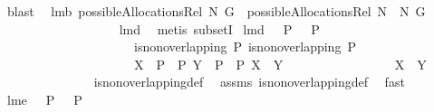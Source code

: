 \begin{isabellebody}
\ blast\ \isanewline
{}\isamarkupfalse%
%
\endisatagproof
{\isafoldproof}%
%
\isadelimproof
\isanewline
%
\endisadelimproof
\isanewline
{}\isamarkupfalse%
\ lm{}{}b{\isacharcolon}\ {\isachardoublequoteopen}possibleAllocationsRel\ N{}\ G\ {\isasymsubseteq}\ possibleAllocationsRel\ {\isacharparenleft}N{}\ {\isasymunion}\ N{}{\isacharparenright}\ G{\isachardoublequoteclose}\isanewline
%
\isadelimproof
\ \ \ \ \ \ \ \ \ \ \ \ \ \ \ \ \ %
\endisadelimproof
%
\isatagproof
{}\isamarkupfalse%
\ lm{}{}d\ \isamarkupfalse%
\ {\isacharparenleft}metis\ subsetI{\isacharparenright}%
\endisatagproof
{\isafoldproof}%
%
\isadelimproof
\isanewline
%
\endisadelimproof
\isanewline
{}\isamarkupfalse%
\ lm{}{}d{\isacharcolon}\ \ {\isachardoublequoteopen}{\isacharparenleft}{\isasymUnion}\ P{}{\isacharparenright}\ {\isasyminter}\ {\isacharparenleft}{\isasymUnion}\ P{}{\isacharparenright}\ {\isacharequal}\ {\isacharbraceleft}{\isacharbraceright}{\isachardoublequoteclose}\ \isanewline
\ \ \ \ \ \ \ \ \ \ \ \ \ \ \ \ \ \ \ \ \ {\isachardoublequoteopen}is{\isacharunderscore}non{\isacharunderscore}overlapping\ P{}{\isachardoublequoteclose}\ {\isachardoublequoteopen}is{\isacharunderscore}non{\isacharunderscore}overlapping\ P{}{\isachardoublequoteclose}\ \isanewline
\ \ \ \ \ \ \ \ \ \ \ \ \ \ \ \ \ \ \ \ \ {\isachardoublequoteopen}X\ {\isasymin}\ P{}\ {\isasymunion}\ P{}{\isachardoublequoteclose}\ {\isachardoublequoteopen}Y\ {\isasymin}\ P{}\ {\isasymunion}\ P{}{\isachardoublequoteclose}\ {\isachardoublequoteopen}X\ {\isasyminter}\ Y\ {\isasymnoteq}\ {\isacharbraceleft}{\isacharbraceright}{\isachardoublequoteclose}\ \isanewline
\ \ \ \ \ \ \ \ \ \ \ \ \ \ {\isachardoublequoteopen}{\isacharparenleft}X\ {\isacharequal}\ Y{\isacharparenright}{\isachardoublequoteclose}\ \isanewline
%
\isadelimproof
\ \ \ \ \ \ \ \ \ \ \ \ \ %
\endisadelimproof
%
\isatagproof
{}\isamarkupfalse%
\ is{\isacharunderscore}non{\isacharunderscore}overlapping{\isacharunderscore}def\ \isamarkupfalse%
\ assms\ is{\isacharunderscore}non{\isacharunderscore}overlapping{\isacharunderscore}def\ \isamarkupfalse%
\ fast%
\endisatagproof
{\isafoldproof}%
%
\isadelimproof
\isanewline
%
\endisadelimproof
\isanewline
{}\isamarkupfalse%
\ lm{}{}e{\isacharcolon}\ \ {\isachardoublequoteopen}{\isacharparenleft}{\isasymUnion}\ P{}{\isacharparenright}\ {\isasyminter}\ {\isacharparenleft}{\isasymUnion}\ P{}{\isacharparenright}\ {\isacharequal}\ {\isacharbraceleft}{\isacharbraceright}{\isachardoublequoteclose}\ \isanewline

\end{isabellebody}
